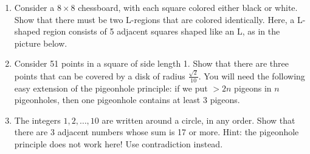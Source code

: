 \documentclass[12pt]{article}
\newcommand{\drawsquare}[2]{\filldraw[black!40!white] ({#1},{#2}) -- ({#1+1},{#2}) -- ({#1+1},{#2+1}) -- ({#1},{#2+1}) -- ({#1},{#2});}
\newcommand{\drawL}[2]{\draw[cyan,line width=1.5mm] ({#1},{#2}) -- ({#1+3},{#2}) -- ({#1+3},{#2+1}) -- ({#1+1},{#2+1}) -- ({#1+1},{#2+3}) -- ({#1},{#2+3}) -- ({#1},{#2});}
\begin{document}
\begin{enumerate}
\begin{enumerate}

\item Consider a \( 8 \times 8 \) chessboard, with each square colored either black or white. Show that there must be two L-regions that are colored identically. Here, a L-shaped region consists of 5 adjacent squares shaped like an L, as in the picture below. \newline
\begin{center} %
\end{center}


\item Consider 51 points in a square of side length 1. Show that there are three points that can be covered by a disk of radius \( \frac{\sqrt{2}}{10} \). You will need the following easy extension of the pigeonhole principle: if we put \( > 2n \) pigeons in \( n \) pigeonholes, then one pigeonhole contains at least 3 pigeons. \newline


\item The integers \( 1, 2, \dots, 10 \) are written around a circle, in any order. Show that there are 3 adjacent numbers whose sum is 17 or more. Hint: the pigeonhole principle does not work here! Use contradiction instead. \newline

\end{enumerate}



\end{enumerate}
\newpage %
\end{document}
